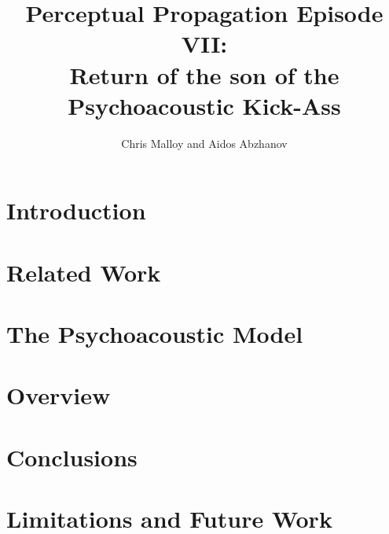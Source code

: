 \documentclass[twocolumn,11pt,notitlepage,oneside]{article}
\title{Perceptual Propagation Episode VII: \\ Return of the son of the Psychoacoustic Kick-Ass}
\author{Chris Malloy and Aidos Abzhanov}
\date{}
\begin{document}
\twocolumn[
  \begin{@twocolumnfalse}
    \maketitle
    
  \end{@twocolumnfalse}
]



\section{Introduction}


\section{Related Work}


\section{The Psychoacoustic Model}


\section{Overview}


\section{Conclusions}


\section{Limitations and Future Work}



\nocite{*}

\clearpage

\end{document}
